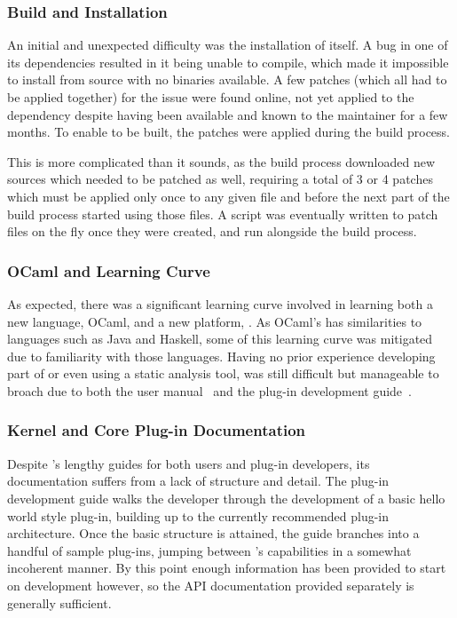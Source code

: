 \subsubsection{Build and Installation}

An initial and unexpected difficulty was the installation of  itself. A bug in one of its dependencies resulted in it being unable to compile, which made it impossible to install from source with no binaries available. A few patches (which all had to be applied together) for the issue were found online, not yet applied to the dependency despite having been available and known to the maintainer for a few months. To enable  to be built, the patches were applied during the build process.

This is more complicated than it sounds, as the build process downloaded new sources which needed to be patched as well, requiring a total of 3 or 4 patches which must be applied only once to any given file and before the next part of the build process started using those files. A script was eventually written to patch files on the fly once they were created, and run alongside the build process.

\subsubsection{OCaml and  Learning Curve}

As expected, there was a significant learning curve involved in learning both a new language, OCaml, and a new platform, . As OCaml's has similarities to languages such as Java and Haskell, some of this learning curve was mitigated due to familiarity with those languages. Having no prior experience developing part of or even using a static analysis tool,  was still difficult but manageable to broach due to both the user manual~\cite{framauser} and the plug-in development guide~\cite{framaplug}.

\subsubsection{Kernel and Core Plug-in Documentation}

Despite 's lengthy guides for both users and plug-in developers, its documentation suffers from a lack of structure and detail. The plug-in development guide walks the developer through the development of a basic hello world style plug-in, building up to the currently recommended plug-in architecture. Once the basic structure is attained, the guide branches into a handful of sample plug-ins, jumping between 's capabilities in a somewhat incoherent manner. By this point enough information has been provided to start on development however, so the API documentation provided separately is generally sufficient.

